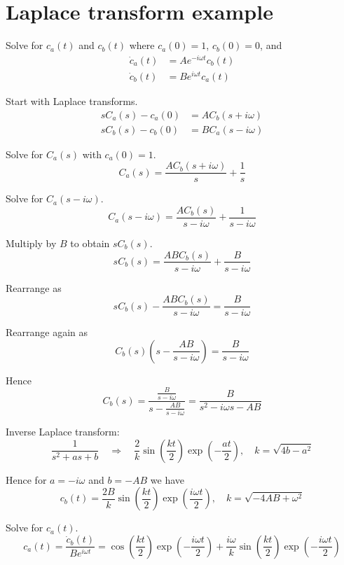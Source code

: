 

\section*{Laplace transform example}

Solve for $c_a(t)$ and $c_b(t)$ where $c_a(0)=1$, $c_b(0)=0$, and
\begin{align*}
\dot c_a(t)&=Ae^{-i\omega t}c_b(t)
\\
\dot c_b(t)&=Be^{i\omega t}c_a(t)
\end{align*}

Start with Laplace transforms.
\begin{align*}
sC_a(s)-c_a(0)&=AC_b(s+i\omega)
\\
sC_b(s)-c_b(0)&=BC_a(s-i\omega)
\end{align*}

Solve for $C_a(s)$ with $c_a(0)=1$.
\begin{equation*}
C_a(s)=\frac{AC_b(s+i\omega)}{s}+\frac{1}{s}
\end{equation*}

Solve for $C_a(s-i\omega)$.
\begin{equation*}
C_a(s-i\omega)=\frac{AC_b(s)}{s-i\omega}+\frac{1}{s-i\omega}
\end{equation*}

Multiply by $B$ to obtain $sC_b(s)$.
\begin{equation*}
sC_b(s)=\frac{ABC_b(s)}{s-i\omega}+\frac{B}{s-i\omega}
\end{equation*}

Rearrange as
\begin{equation*}
sC_b(s)-\frac{ABC_b(s)}{s-i\omega}=\frac{B}{s-i\omega}
\end{equation*}

Rearrange again as
\begin{equation*}
C_b(s)\left(s-\frac{AB}{s-i\omega}\right)=\frac{B}{s-i\omega}
\end{equation*}

Hence
\begin{equation*}
C_b(s)=\frac
{\displaystyle\frac{B}{s-i\omega}}
{\displaystyle s-\frac{AB}{s-i\omega}}
=\frac{B}{s^2-i\omega s-AB}
\end{equation*}

Inverse Laplace transform:
\begin{equation*}
\frac{1}{s^2+as+b}\quad\Rightarrow\quad
\frac{2}{k}\sin\left(\frac{kt}{2}\right)\exp\left(-\frac{at}{2}\right),\quad
k=\sqrt{4b-a^2}
\end{equation*}

Hence for $a=-i\omega$ and $b=-AB$ we have
\begin{equation*}
c_b(t)=\frac{2B}{k}
\sin\left(\frac{kt}{2}\right)
\exp\left(\frac{i\omega t}{2}\right),\quad
k=\sqrt{-4AB+\omega^2}
\end{equation*}

Solve for $c_a(t)$.
\begin{equation*}
c_a(t)=\frac{\dot c_b(t)}{Be^{i\omega t}}
=\cos\left(\frac{kt}{2}\right)\exp\left(-\frac{i\omega t}{2}\right)
+\frac{i\omega}{k}\sin\left(\frac{kt}{2}\right)\exp\left(-\frac{i\omega t}{2}\right)
\end{equation*}


